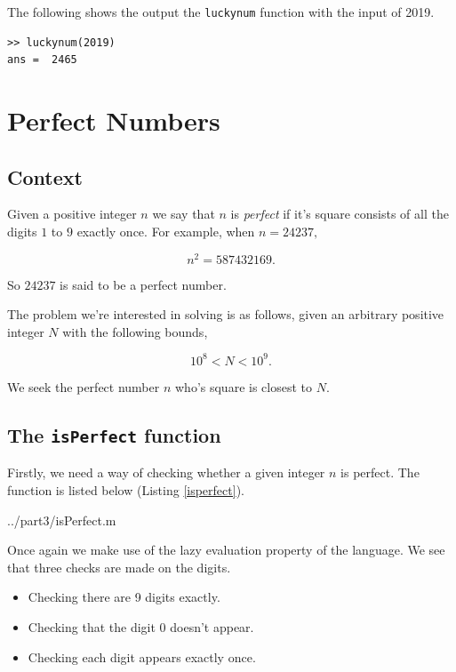 \documentclass[10pt]{article}
\begin{document}
The following shows the output the \texttt{luckynum} function with the input of 2019.

\begin{verbatim}
>> luckynum(2019)
ans =  2465
\end{verbatim}

\section{Perfect Numbers}

\subsection{Context}
Given a positive integer $n$ we say that $n$ is \emph{perfect} if it's square consists of all the digits $1$ to $9$ exactly once. For example, when $ n = 24237, $

$$ n^2 = 587432169 .$$

\noindent So $24237$ is said to be a perfect number.

The problem we're interested in solving is as follows, given an arbitrary positive integer $N$ with the following bounds,

\begin{equation} \label{rangeN}
10^8 < N < 10^{9}.
\end{equation}


\noindent We seek the perfect number $n$ who's square is closest to $N$.

\subsection{The \texttt{isPerfect} function}

Firstly, we need a way of checking whether a given integer $n$ is perfect. The function is listed below (Listing \ref{isperfect}).

  {../part3/isPerfect.m}
 
Once again we make use of the lazy evaluation property of the language. We see that three checks are made on the digits.
 
 \begin{itemize}
 \item Checking there are 9 digits exactly.
 \item Checking that the digit $0$ doesn't appear.
 \item Checking each digit appears exactly once.
 \end{itemize}
 
\end{document}
